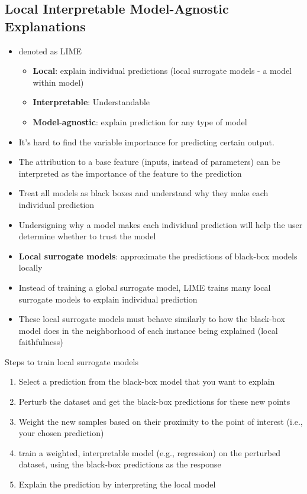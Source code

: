 \documentclass[
]{book}
\providecommand{\tightlist}{%
  \setlength{\itemsep}{0pt}\setlength{\parskip}{0pt}}
\begin{document}
\hypertarget{local-interpretable-model-agnostic-explanations}{%
\subsection{Local Interpretable Model-Agnostic Explanations}\label{local-interpretable-model-agnostic-explanations}}

\begin{itemize}
\item
  denoted as LIME \citep{ribeiro2016}

  \begin{itemize}
  \item
    \textbf{Local}: explain individual predictions (local surrogate models - a model within model)
  \item
    \textbf{Interpretable}: Understandable
  \item
    \textbf{Model}-\textbf{agnostic}: explain prediction for any type of model
  \end{itemize}
\item
  It's hard to find the variable importance for predicting certain output.
\item
  The attribution to a base feature (inputs, instead of parameters) can be interpreted as the importance of the feature to the prediction
\item
  Treat all models as black boxes and understand why they make each individual prediction
\item
  Undersigning why a model makes each individual prediction will help the user determine whether to trust the model
\item
  \textbf{Local surrogate models}: approximate the predictions of black-box models locally
\item
  Instead of training a global surrogate model, LIME trains many local surrogate models to explain individual prediction
\item
  These local surrogate models must behave similarly to how the black-box model does in the neighborhood of each instance being explained (local faithfulness)
\end{itemize}

Steps to train local surrogate models

\begin{enumerate}
\def\labelenumi{\arabic{enumi}.}
\tightlist
\item
  Select a prediction from the black-box model that you want to explain
\item
  Perturb the dataset and get the black-box predictions for these new points
\item
  Weight the new samples based on their proximity to the point of interest (i.e., your chosen prediction)
\item
  train a weighted, interpretable model (e.g., regression) on the perturbed dataset, using the black-box predictions as the response
\item
  Explain the prediction by interpreting the local model
\end{enumerate}
\end{document}
